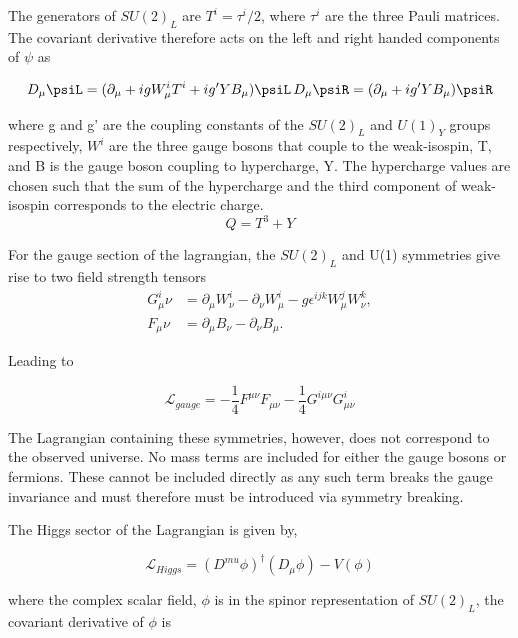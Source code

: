 The generators of $SU(2)_L$ are $T^i = \tau^i/2$, where $\tau^i$ are the three Pauli matrices. 
The covariant derivative therefore acts on the left and right handed components of $\psi$ as

\begin{equation}
D_{\mu} \psiL = (\partial_\mu + igW^i_{\mu}T^i + ig'YB_\mu)\psiL \, D_{\mu} \psiR = (\partial_\mu + ig'YB_\mu)\psiR
\end{equation}

where g and g' are the coupling constants of the $SU(2)_L$ and $U(1)_Y$ groups respectively, 
$W^i$ are the three gauge bosons that couple to the weak-isospin, T, and B is the gauge boson
coupling to hypercharge, Y. The hypercharge values are chosen such that the sum of the hypercharge and 
the third component of weak-isospin corresponds to the electric charge.
\begin{equation}
\label{equ:charge}
Q = T^{3} + Y
\end{equation}

For the gauge section of the lagrangian, the $SU(2)_L$ and U(1) symmetries give rise to two field strength tensors
\begin{align}
G^i_\mu\nu &= \partial_\mu W^i_\nu - \partial_\nu W^i_\mu - g \epsilon^{ijk}W^j_\mu W^k_\nu,\\
F_\mu\nu &= \partial_\mu B_\nu - \partial_\nu B_\mu.
\end{align}

Leading to

\begin{equation}
\mathcal{L}_{gauge} = -\frac{1}{4}F^{\mu\nu}F_{\mu\nu} - \frac{1}{4}G^{i\mu\nu}G^{i}_{\mu\nu}
\end{equation}

The Lagrangian containing these symmetries, however, does not correspond to the observed universe. No mass terms
are included for either the gauge bosons or fermions. These cannot be included directly as any such term breaks 
the gauge invariance and must therefore must be introduced via symmetry breaking.

The Higgs sector of the Lagrangian is given by,

\begin{equation}
\label{equ:higgs-lagrangian}
\mathcal{L}_{Higgs} = (D^{mu}\phi)^{\dagger}(D_{\mu}\phi) - V(\phi)
\end{equation}

where the complex scalar field, $\phi$ is in the spinor representation of $SU(2)_L$, the covariant derivative of $\phi$ is

